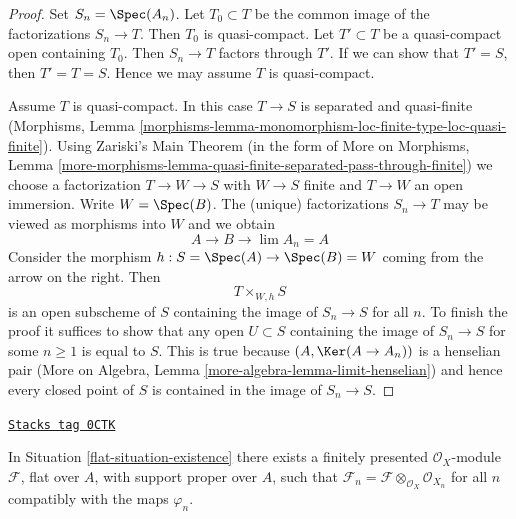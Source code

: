 \begin{proof}
Set $S_n = \Spec(A_n)$. Let $T_0 \subset T$ be the common
image of the factorizations $S_n \to T$. Then $T_0$ is quasi-compact.
Let $T' \subset T$ be a quasi-compact open containing $T_0$.
Then $S_n \to T$ factors through $T'$.
If we can show that $T' = S$, then $T' = T = S$.
Hence we may assume $T$ is quasi-compact.

\medskip\noindent
Assume $T$ is quasi-compact.
In this case $T \to S$ is separated and quasi-finite
(Morphisms, Lemma
\ref{morphisms-lemma-monomorphism-loc-finite-type-loc-quasi-finite}).
Using Zariski's Main Theorem
(in the form of More on Morphisms, Lemma
\ref{more-morphisms-lemma-quasi-finite-separated-pass-through-finite})
we choose a factorization $T \to W \to S$ with $W \to S$ finite
and $T \to W$ an open immersion. Write $W = \Spec(B)$.
The (unique) factorizations $S_n \to T$ may be viewed
as morphisms into $W$ and we obtain
$$
A \longrightarrow B \longrightarrow \lim A_n = A
$$
Consider the morphism $h : S = \Spec(A) \to \Spec(B) = W$ coming
from the arrow on the right. Then
$$
T \times_{W, h} S
$$
is an open subscheme of $S$ containing the image of $S_n \to S$ for all $n$.
To finish the proof it suffices to show that any open $U \subset S$
containing the image of $S_n \to S$ for some $n \geq 1$ is equal to $S$.
This is true because $(A, \Ker(A \to A_n))$ is a henselian pair
(More on Algebra, Lemma \ref{more-algebra-lemma-limit-henselian})
and hence every closed point of $S$ is contained in the image of $S_n \to S$.
\end{proof}

\begin{theorem}

\label{flat-theorem-existence}
\href{https://stacks.math.columbia.edu/tag/0CTK}{\texttt{Stacks tag 0CTK}}

In Situation \ref{flat-situation-existence}
there exists a finitely presented $\mathcal{O}_X$-module
$\mathcal{F}$, flat over $A$, with support proper over $A$,
such that
$\mathcal{F}_n = \mathcal{F} \otimes_{\mathcal{O}_X} \mathcal{O}_{X_n}$
for all $n$ compatibly with the maps $\varphi_n$.
\end{theorem}

